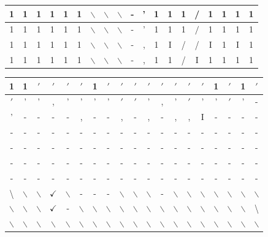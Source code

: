 \documentclass[10pt]{article}
\begin{document}
\begin{center}
\begin{tabular}{|c|c|c|c|c|c|c|c|c|c|c|c|c|c|c|c|c|c|c|}
\hline
1 & 1 & 1 & 1 & 1 & 1 & $\backslash$ & $\backslash$ & $\backslash$ & - & ' & 1 & 1 & 1 & / & 1 & 1 & 1 & 1 \\
\hline
1 & 1 & 1 & 1 & 1 & 1 & $\backslash$ & $\backslash$ & $\backslash$ & - & ' & 1 & 1 & 1 & $/$ & 1 & 1 & 1 & 1 \\
\hline
1 & 1 & 1 & 1 & 1 & 1 & $\backslash$ & $\backslash$ & $\backslash$ & - & , & 1 & I & / & / & I & 1 & I & 1 \\
\hline
1 & 1 & 1 & 1 & 1 & 1 & $\backslash$ & $\backslash$ & $\backslash$ & - & , & 1 & 1 & / & I & 1 & 1 & 1 & 1 \\
\hline
\end{tabular}
\end{center}

\begin{center}
\begin{tabular}{|c|c|c|c|c|c|c|c|c|c|c|c|c|c|c|c|c|c|c|}
\hline
1 & 1 & $\prime$ & $\prime$ & $\prime$ & $\prime$ & 1 & $\prime$ & $\prime$ & $\prime$ & $\prime$ & $\prime$ & $\prime$ & $\prime$ & $\prime$ & 1 & $\prime$ & 1 & $\prime$ \\
\hline
$\prime$ & ' & ' & , & ' & ' & ' & ' & $\prime$ & $\prime$ & ' & , & ' & $\prime$ & ' & ' & $\prime$ & ' & - \\
\hline
' & - & - & - & - & , & - & - & , & - & , & - & , & , & I & - & - & - & - \\
\hline
- & - & - & - & - & - & - & - & - & - & - & - & - & - & - & - & - & - & - \\
\hline
- & - & - & - & - & - & - & - & - & - & - & - & - & - & - & - & - & - & - \\
\hline
- & - & - & - & - & - & - & - & - & - & - & - & - & - & - & - & - & - & - \\
\hline
- & - & - & - & - & - & - & - & - & - & - & - & - & - & - & - & - & - & - \\
\hline
\textbackslash  & $\backslash$ & $\backslash$ & $\checkmark$ & $\backslash$ & - & - & - & $\backslash$ & $\backslash$ & $\backslash$ & - & $\backslash$ & $\backslash$ & $\backslash$ & $\backslash$ & $\backslash$ & $\backslash$ & $\backslash$ \\
\hline
$\backslash$ & $\backslash$ & $\backslash$ & $\checkmark$ & - & $\backslash$ & $\backslash$ & $\backslash$ & $\backslash$ & $\backslash$ & $\backslash$ & $\backslash$ & $\backslash$ & $\backslash$ & $\backslash$ & $\backslash$ & $\backslash$ & $\backslash$ & \textbackslash  \\
\hline
$\backslash$ & $\backslash$ & $\backslash$ & $\backslash$ & $\backslash$ & $\backslash$ & $\backslash$ & $\backslash$ & $\backslash$ & $\backslash$ & $\backslash$ & $\backslash$ & $\backslash$ & $\backslash$ & $\backslash$ & $\backslash$ & $\backslash$ & $\backslash$ & $\backslash$ \\

\end{tabular}
\end{center}
\end{document}
